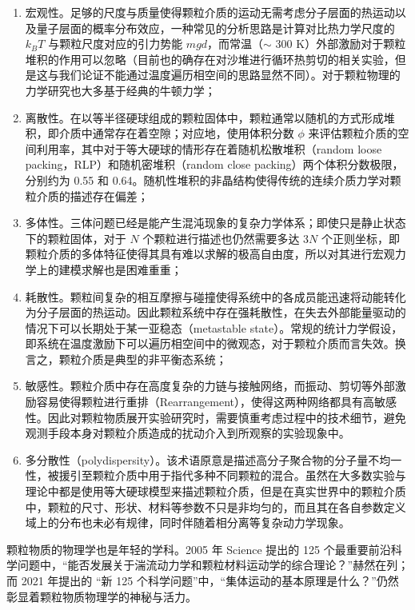 \begin{enumerate}
  \item 宏观性。足够的尺度与质量使得颗粒介质的运动无需考虑分子层面的热运动以及量子层面的概率分布效应，一种常见的分析思路是计算对比热力学尺度的 $k_{B}T$ 与颗粒尺度对应的引力势能 $mgd$，而常温（$\sim$ 300 \unit{\kelvin}）外部激励对于颗粒堆积的作用可以忽略（目前也的确存在对沙堆进行循环热剪切的相关实验\cite{YIN2023100503}，但是这与我们论证不能通过温度遍历相空间的思路显然不同）。对于颗粒物理的力学研究也大多基于经典的牛顿力学；
  \item 离散性。在以等半径硬球组成的颗粒固体中，颗粒通常以随机的方式形成堆积，即介质中通常存在着空隙；对应地，使用体积分数 $\phi$ 来评估颗粒介质的空间利用率，其中对于等大硬球的情形存在着随机松散堆积（random loose packing，RLP）和随机密堆积（random close packing）两个体积分数极限，分别约为 0.55\cite{PhysRevLett.64.2727} 和 0.64\cite{RevModPhys.82.789}。随机性堆积的非晶结构使得传统的连续介质力学对颗粒介质的描述存在偏差\cite{RevModPhys.71.435}；
  \item 多体性。三体问题已经是能产生混沌现象的复杂力学体系；即使只是静止状态下的颗粒固体，对于 $N$ 个颗粒进行描述也仍然需要多达 $3N$ 个正则坐标，即颗粒介质的多体特征使得其具有难以求解的极高自由度，所以对其进行宏观力学上的建模求解也是困难重重；
  \item 耗散性。颗粒间复杂的相互摩擦与碰撞使得系统中的各成员能迅速将动能转化为分子层面的热运动。因此颗粒系统中存在强耗散性，在失去外部能量驱动的情况下可以长期处于某一亚稳态（metastable state）。常规的统计力学假设，即系统在温度激励下可以遍历相空间中的微观态，对于颗粒介质而言失效。换言之，颗粒介质是典型的非平衡态系统；
  \item 敏感性。颗粒介质中存在高度复杂的力链与接触网络，而振动、剪切等外部激励容易使得颗粒进行重排（Rearrangement），使得这两种网络都具有高敏感性。因此对颗粒物质展开实验研究时，需要慎重考虑过程中的技术细节，避免观测手段本身对颗粒介质造成的扰动介入到所观察的实验现象中。
  \item 多分散性（polydispersity）。该术语原意是描述高分子聚合物的分子量不均一性，被援引至颗粒介质中用于指代多种不同颗粒的混合。虽然在大多数实验与理论中都是使用等大硬球模型来描述颗粒介质，但是在真实世界中的颗粒介质中，颗粒的尺寸、形状\cite{vandenwildenbergProbingEffectParticle2015}、材料等参数不只是非均匀的，而且其在各自参数定义域上的分布也未必有规律，同时伴随着相分离\cite{doi:10.1126/sciadv.abe8737}等复杂动力学现象。
\end{enumerate}

颗粒物质的物理学也是年轻的学科。2005 年 Science 提出的 125 个最重要前沿科学问题\cite{doi:10.1126/science.309.5731.78b}中，“能否发展关于湍流动力学和颗粒材料运动学的综合理论？”赫然在列；而 2021 年提出的 “新 125 个科学问题”\cite{sanders2021125}中，“集体运动的基本原理是什么？”仍然彰显着颗粒物质物理学的神秘与活力。

